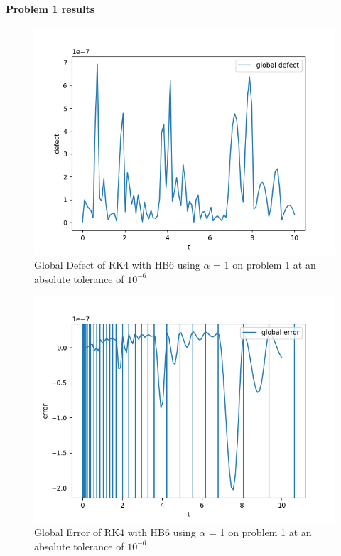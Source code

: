 \documentclass{article}
\begin{document}
\paragraph{Problem 1 results}
\begin{figure}[H]
\centering
\includegraphics[width=0.7\linewidth]{./figures/static_alpha_rk4_with_hb6_p1_global_defect}
\caption{Global Defect of RK4 with HB6 using $\alpha$ = 1 on problem 1 at an absolute tolerance of $10^{-6}$}
\label{fig:static_alpha_rk4_with_hb6_p1_global_defect}
\end{figure}

\begin{figure}[H]
\centering
\includegraphics[width=0.7\linewidth]{./figures/static_alpha_rk4_with_hb6_p1_global_error}
\caption{Global Error of RK4 with HB6 using $\alpha$ = 1 on problem 1 at an absolute tolerance of $10^{-6}$}
\label{fig:static_alpha_rk4_with_hb6_p1_global_error}
\end{figure}
\end{document}
